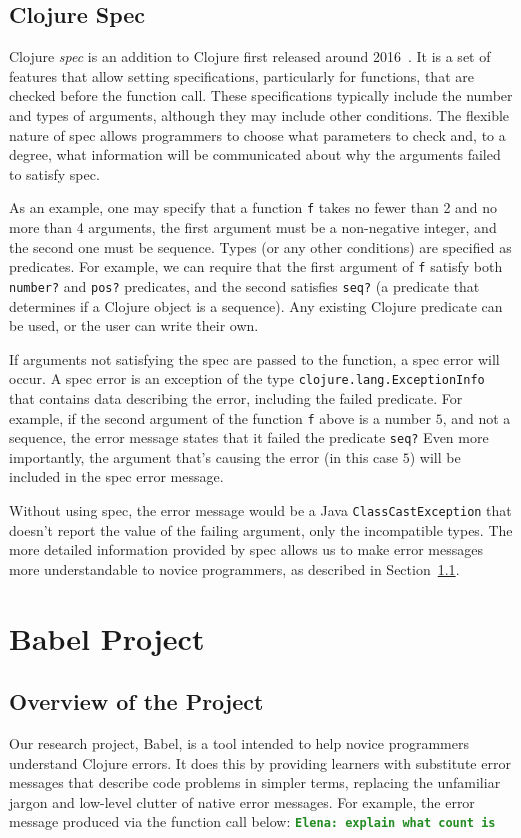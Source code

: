 \documentclass[12pt]{article}
\newcommand{\comment}[1]{{\bf \tt  {#1}}}
\newcommand{\emcomment}[1]{\textcolor{ForestGreen}{\comment{Elena: {#1}}}}
\newcommand{\jscomment}[1]{\textcolor{olive}{\comment{Jaydon: {#1}}}}
\begin{document}
\subsection{Clojure Spec}\label{subsec:spec}
Clojure \textit{spec} is an addition to Clojure first released around 2016~\cite{spec-overview}.
It is a set of features that allow setting specifications, particularly for functions, that are checked before the function call. 
These specifications typically include the number and types of arguments, although they may include other conditions.
The flexible nature of spec allows programmers to choose what parameters to check and, to a degree, what information will be communicated about why the arguments failed to satisfy spec.

As an example, one may specify that a function \texttt{f} takes no fewer than 2 and no more than 4 arguments, the first argument must be a non-negative integer, and the second one must be sequence. 
Types (or any other conditions) are specified as predicates. 
For example, we can require that the first argument of \texttt{f} satisfy both \texttt{number?} and \texttt{pos?} predicates, and the second satisfies \texttt{seq?} (a predicate that determines if a Clojure object is a sequence).
Any existing Clojure predicate can be used, or the user can write their own. 

If arguments not satisfying the spec are passed to the function, a spec error will occur. 
A spec error is an exception of the type \texttt{clojure.lang.ExceptionInfo} that contains data describing the error, including the failed predicate.
For example, if the second argument of the function 
\texttt{f} above is a number $5$, and not a sequence, the error message states that it failed the predicate \texttt{seq?}
Even more importantly, the argument that's causing the error (in this case $5$) will be included in the spec error message.

Without using spec, the error message would be a Java \texttt{ClassCastException} that doesn't report the value of the failing argument, only the incompatible types. 
The more detailed information provided by spec allows us to make error messages more understandable to novice programmers, as described in Section~\ref{subsec:overview}. 

\section{Babel Project}\label{sec:babel}
\subsection{Overview of the Project}\label{subsec:overview}
Our research project, Babel, is a tool intended to help novice programmers understand Clojure errors. It does this by providing learners with substitute error messages that describe code problems in simpler terms, replacing the unfamiliar jargon and low-level clutter of native error messages. For example, the error message produced via the function call below: \emcomment{explain what count is}
\end{document}
